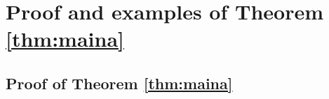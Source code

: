 \documentclass[11pt,reqno]{amsart}
\theoremstyle{remark}
\begin{document}
%
%

\section{Proof and examples of Theorem \ref{thm:maina}}
\label{sec:Proof_of_Maina}

\subsection{Proof of Theorem \ref{thm:maina}}
\end{document}
